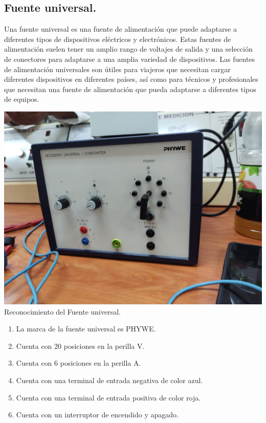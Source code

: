 \documentclass[10pt]{article}
\begin{document}
\begin{multicols}{2}
\subsection{Fuente universal.}

Una fuente universal es una fuente de alimentación que puede adaptarse a diferentes tipos de dispositivos eléctricos y electrónicos. Estas fuentes de alimentación suelen tener un amplio rango de voltajes de salida y una selección de conectores para adaptarse a una amplia variedad de dispositivos. Las fuentes de alimentación universales son útiles para viajeros que necesitan cargar diferentes dispositivos en diferentes países, así como para técnicos y profesionales que necesitan una fuente de alimentación que pueda adaptarse a diferentes tipos de equipos.

\begin{center}
\includegraphics[scale=0.1]{Fuente}\\
Reconocimiento del Fuente universal.
\begin{enumerate}
\item La marca de la fuente universal es PHYWE.
\item Cuenta con 20 posiciones en la perilla V.
\item Cuenta con 6 posiciones en la perilla A.
\item Cuenta con una terminal de entrada negativa de color azul.
\item Cuenta con una terminal de entrada positiva de color roja.
\item Cuenta con un interruptor de encendido y apagado.
\end{enumerate}
\end{center}


\end{multicols}
\end{document}
